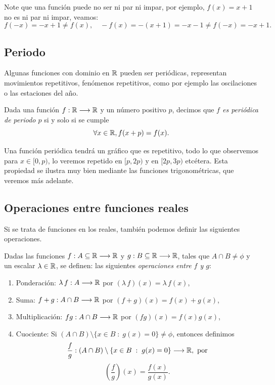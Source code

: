Note que una funci\'on puede no ser ni par ni impar, por ejemplo,
$f(x) = x+1$ no es ni par ni impar, veamos:
\[
	f(-x) = -x+1 \ne f(x),\quad  -f(x)=-(x+1)=-x-1\neq f(-x) = -x+1.
\]

\subsection{Periodo}

Algunas funciones con dominio en $\mathbb{R}$ pueden ser periódicas, representan movimientos repetitivos, fenómenos repetitivos, como por ejemplo las oscilaciones o las estaciones del año.

\vspace{.2cm}

\begin{defn}
Dada una funci\'on $f :  \mathbb{R} \longrightarrow \mathbb{R}$ y un número positivo $p$, decimos que  \emph{$f$ es
 periódica de periodo $p$} si y solo si se cumple
 $$ \forall x\in\mathbb{R}, f(x+p)=f(x).$$
\end{defn}

Una función periódica tendrá un gráfico que es repetitivo, todo lo que observemos para $x\in[0,p)$, lo veremos repetido en $[p,2p)$ y en $[2p,3p)$ etcétera.
Esta propiedad se ilustra muy bien mediante las funciones trigonométricas, que veremos más adelante.

\subsection{Operaciones entre funciones reales}

Si se trata de funciones en los reales, también podemos definir las siguientes operaciones.
\begin{defn}
	Dadas las funciones $f : A\subseteq \mathbb{R} \longrightarrow \mathbb{R}$ y $g: B \subseteq \mathbb{R} \longrightarrow \mathbb{R}$, tales que $A\cap B\not =\phi$ y un escalar $\lambda \in \mathbb{R}$, se definen:
	las siguientes \emph{operaciones entre $f$ y $g$}:
	\begin{enumerate}
		\item Ponderación: $\lambda\,f: A \longrightarrow \mathbb{R}$ por $(\lambda\,f)(x) = \lambda\,f(x)$,
		\item Suma: $f+ g : A \cap B \longrightarrow \mathbb{R}$ por $(f+ g)(x) = f(x)+ g(x)$,
		\item Multiplicación: $fg: A \cap B \longrightarrow \mathbb{R}$ por $(fg)(x) = f(x)g(x)$,
		\item Cuociente: Si $(A \cap B) \setminus \{x \in B\;:\; g(x) = 0\}\not = \phi$, entonces definimos 
		$$\dfrac f g: (A \cap B) \setminus \{x \in B\;:\; g(x) = 0\} \longrightarrow \mathbb{R},\textrm{ por}$$
			$$\left(\dfrac f g\right)(x) = \dfrac{f(x)}{g(x)}.$$
	\end{enumerate}
\end{defn}

